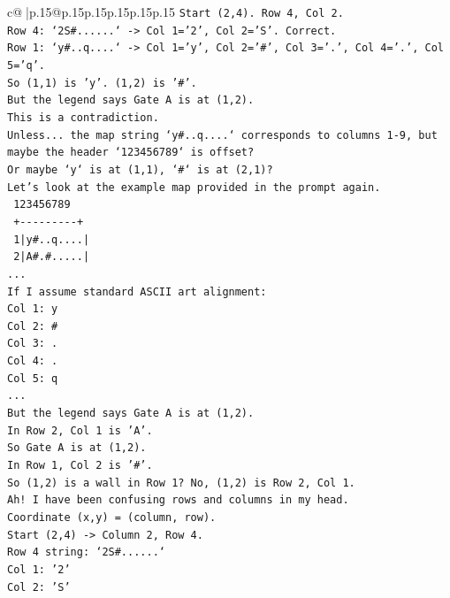 \documentclass{article}
\begin{document}
{\begin{supertabular}{c@{$\;$}|p{.15\linewidth}@{}p{.15\linewidth}p{.15\linewidth}p{.15\linewidth}p{.15\linewidth}p{.15\linewidth}}
{{{\texttt{Start (2,4). Row 4, Col 2.} \\
\texttt{Row 4: `2S\#......` {-}> Col 1='2', Col 2='S'. Correct.} \\
\texttt{Row 1: `y\#..q....` {-}> Col 1='y', Col 2='\#', Col 3='.', Col 4='.', Col 5='q'.} \\
\texttt{So (1,1) is 'y'. (1,2) is '\#'.} \\
\texttt{But the legend says Gate A is at (1,2).} \\
\texttt{This is a contradiction.} \\
\texttt{Unless... the map string `y\#..q....` corresponds to columns 1{-}9, but maybe the header `123456789` is offset?} \\
\texttt{Or maybe `y` is at (1,1), `\#` is at (2,1)?} \\
\texttt{Let's look at the example map provided in the prompt again.} \\
\texttt{   123456789} \\
\texttt{  +{-}{-}{-}{-}{-}{-}{-}{-}{-}+} \\
\texttt{ 1|y\#..q....|} \\
\texttt{ 2|A\#.\#.....|} \\
\texttt{...} \\
\texttt{If I assume standard ASCII art alignment:} \\
\texttt{Col 1: y} \\
\texttt{Col 2: \#} \\
\texttt{Col 3: .} \\
\texttt{Col 4: .} \\
\texttt{Col 5: q} \\
\texttt{...} \\
\texttt{But the legend says Gate A is at (1,2).} \\
\texttt{In Row 2, Col 1 is 'A'.} \\
\texttt{So Gate A is at (1,2).} \\
\texttt{In Row 1, Col 2 is '\#'.} \\
\texttt{So (1,2) is a wall in Row 1? No, (1,2) is Row 2, Col 1.} \\
\texttt{Ah! I have been confusing rows and columns in my head.} \\
\texttt{Coordinate (x,y) = (column, row).} \\
\texttt{Start (2,4) {-}> Column 2, Row 4.} \\
\texttt{Row 4 string: `2S\#......`} \\
\texttt{Col 1: '2'} \\
\texttt{Col 2: 'S'} \\
}}}
\end{supertabular}}
\end{document}
